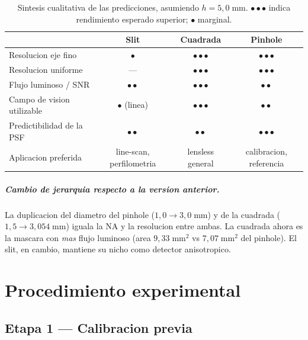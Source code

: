 \documentclass[11pt,a4paper,oneside]{report}
\begin{document}
\begin{table}[h!]
\centering
\caption{Sintesis cualitativa de las predicciones, asumiendo $h = 5{,}0\;\mathrm{mm}$.
$\bullet\bullet\bullet$ indica rendimiento esperado superior; $\bullet$ marginal.}
\renewcommand{\arraystretch}{1.4}
\begin{tabular}{p{4.5cm}ccc}
\toprule
 & \textbf{Slit} & \textbf{Cuadrada} & \textbf{Pinhole} \\
\midrule
Resolucion eje fino             & $\bullet$               & $\bullet\bullet\bullet$ & $\bullet\bullet\bullet$ \\
Resolucion uniforme             & ---                     & $\bullet\bullet\bullet$ & $\bullet\bullet\bullet$ \\
Flujo luminoso / SNR            & $\bullet\bullet$        & $\bullet\bullet\bullet$ & $\bullet\bullet$  \\
Campo de vision utilizable      & $\bullet$ (linea)       & $\bullet\bullet\bullet$ & $\bullet\bullet$  \\
Predictibilidad de la PSF       & $\bullet\bullet$        & $\bullet\bullet$        & $\bullet\bullet\bullet$ \\
Aplicacion preferida            & line-scan, perfilometria & lensless general & calibracion, referencia \\
\bottomrule
\end{tabular}
\label{tab:predicciones}
\end{table}

\paragraph{Cambio de jerarquia respecto a la version anterior.}
La duplicacion del diametro del pinhole ($1{,}0 \to 3{,}0\;\mathrm{mm}$) y de
la cuadrada ($1{,}5 \to 3{,}054\;\mathrm{mm}$) iguala la NA y la resolucion
entre ambas. La cuadrada ahora es la mascara con \emph{mas} flujo luminoso
(area $9{,}33\;\mathrm{mm}^2$ vs $7{,}07\;\mathrm{mm}^2$ del pinhole). El
slit, en cambio, mantiene su nicho como detector anisotropico.

\chapter{Procedimiento experimental}

\section{Etapa 1 --- Calibracion previa}
\end{document}
